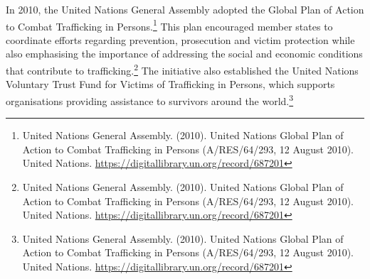 In 2010, the United Nations General Assembly adopted the Global Plan of Action to Combat Trafficking in Persons.\footnote{United Nations General Assembly. (2010). United Nations Global Plan of Action to Combat Trafficking in Persons (A/RES/64/293, 12 August 2010). United Nations. \url{https://digitallibrary.un.org/record/687201}} This plan encouraged member states to coordinate efforts regarding prevention, prosecution and victim protection while also emphasising the importance of addressing the social and economic conditions that contribute to trafficking.\footnote{United Nations General Assembly. (2010). United Nations Global Plan of Action to Combat Trafficking in Persons (A/RES/64/293, 12 August 2010). United Nations. \url{https://digitallibrary.un.org/record/687201}} The initiative also established the United Nations Voluntary Trust Fund for Victims of Trafficking in Persons, which supports organisations providing assistance to survivors around the world.\footnote{United Nations General Assembly. (2010). United Nations Global Plan of Action to Combat Trafficking in Persons (A/RES/64/293, 12 August 2010). United Nations. \url{https://digitallibrary.un.org/record/687201}}

